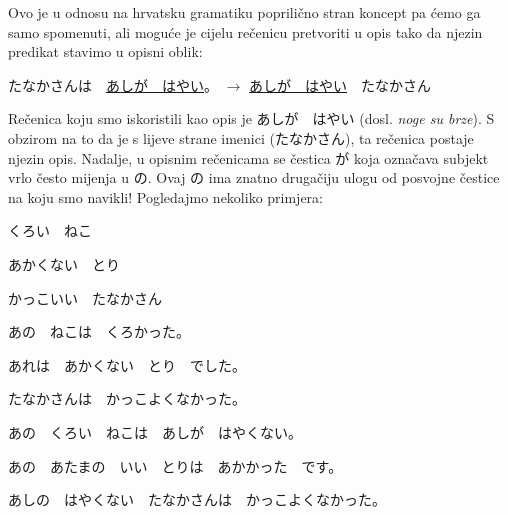 	
	Ovo je u odnosu na hrvatsku gramatiku poprilično stran koncept pa ćemo ga samo spomenuti, ali moguće je cijelu rečenicu pretvoriti u opis tako da njezin predikat stavimo u opisni oblik:
	
	\vspace{10pt}
	たなかさんは　\underline{あしが　はやい}。 $\rightarrow$ \underline{あしが　はやい}　たなかさん
	
	\vspace{10pt}\noindent
	Rečenica koju smo iskoristili kao opis je あしが　はやい (dosl. \textit{noge su brze}). S obzirom na to da je s lijeve strane imenici (たなかさん), ta rečenica postaje njezin opis. Nadalje, u opisnim rečenicama se čestica が koja označava subjekt vrlo često mijenja u の. Ovaj の ima znatno drugačiju ulogu od posvojne čestice na koju smo navikli! Pogledajmo nekoliko primjera:
	
	\begin{reibun}
	\end{reibun}

	
	\vspace{-30pt}
	\begin{mondai}{}
		\item くろい　ねこ
		\item あかくない　とり
		\item かっこいい　たなかさん
		\vspace{5pt}
		\item あの　ねこは　くろかった。
		\item あれは　あかくない　とり　でした。
		\item たなかさんは　かっこよくなかった。
		\vspace{5pt}
		\item あの　くろい　ねこは　あしが　はやくない。
		\item あの　あたまの　いい　とりは　あかかった　です。
		\item あしの　はやくない　たなかさんは　かっこよくなかった。
	\end{mondai}

	

